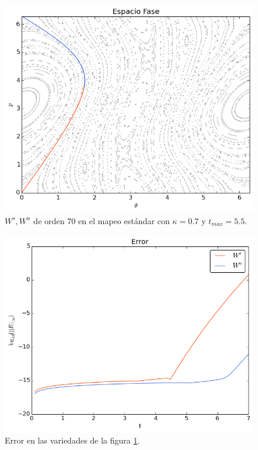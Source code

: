 \begin{figure}[H]
\centering
\includegraphics[scale=0.6]{estandark07}
\caption{$W^{s},W^{u}$ de orden 70 en el mapeo estándar con $\kappa=0.7$ y $t_{max}=5.5$.}
\label{estandar07}
\end{figure}

\begin{figure}[H]
\centering
\includegraphics[scale=0.6]{error_est_k07} 
\caption{Error en las variedades de la figura \ref{estandar07}.}
\label{error est k07}
\end{figure}


